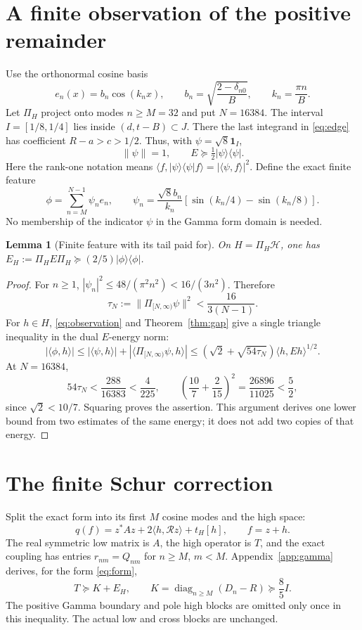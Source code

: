 \documentclass[11pt]{article}
\newtheorem{lemma}{Lemma}
\newcommand{\norm}[1]{\lVert#1\rVert}
\newcommand{\ip}[2]{\langle#1,#2\rangle}
\newcommand{\ind}{\mathbf1}
\newcommand{\HH}{\mathcal H}
\newcommand{\RR}{\mathcal R}
\begin{document}
\section{A finite observation of the positive remainder}
Use the orthonormal cosine basis
\[
 e_n(x)=b_n\cos(k_nx),\qquad b_n=\sqrt{\frac{2-\delta_{n0}}B},
 \qquad k_n=\frac{\pi n}{B}.
\]
Let $\Pi_H$ project onto modes $n\ge M=32$ and put $N=16384$. The interval $I=[1/8,1/4]$ lies inside $(d,t-B)\subset J$. There the last integrand in \eqref{eq:edge} has coefficient $R-a>c>1/2$. Thus, with $\psi=\sqrt8\ind_I$,
\begin{equation}
 \norm\psi=1,\qquad E\succeq\tfrac12|\psi\rangle\langle\psi|.
 \label{eq:observation}
\end{equation}
Here the rank-one notation means $\ip f{|\psi\rangle\langle\psi|f}=|\ip\psi f|^2$.
Define the exact finite feature
\begin{equation}
 \phi=\sum_{n=M}^{N-1}\psi_ne_n,\qquad
 \psi_n=\frac{\sqrt8 b_n}{k_n}\left[\sin(k_n/4)-\sin(k_n/8)\right].
 \label{eq:feature}
\end{equation}
No membership of the indicator $\psi$ in the Gamma form domain is needed.

\begin{lemma}[Finite feature with its tail paid for]\label{lem:feature}
On $H=\Pi_H\HH$, one has $E_H:=\Pi_HE\Pi_H\succeq(2/5)|\phi\rangle\langle\phi|$.
\end{lemma}
\begin{proof}
For $n\ge1$, $|\psi_n|^2\le48/(\pi^2n^2)<16/(3n^2)$. Therefore
\[
 \tau_N:=\norm{\Pi_{[N,\infty)}\psi}^2<\frac{16}{3(N-1)}.
\]
For $h\in H$, \eqref{eq:observation} and Theorem~\ref{thm:gap} give a single triangle inequality in the dual $E$-energy norm:
\[
 |\ip\phi h|\le |\ip\psi h|+|\ip{\Pi_{[N,\infty)}\psi}h|
 \le\left(\sqrt2+\sqrt{54\tau_N}\right)\ip h{Eh}^{1/2}.
\]
At $N=16384$,
\[
 54\tau_N<\frac{288}{16383}<\frac4{225},\qquad
 \left(\frac{10}{7}+\frac2{15}\right)^2
 =\frac{26896}{11025}<\frac52,
\]
since $\sqrt2<10/7$. Squaring proves the assertion. This argument derives one lower bound from two estimates of the same energy; it does not add two copies of that energy.
\end{proof}

\section{The finite Schur correction}
Split the exact form into its first $M$ cosine modes and the high space:
\begin{equation}
 q(f)=z^*Az+2\ip h{\RR z}+t_H[h],\qquad f=z+h.\label{eq:blocks}
\end{equation}
The real symmetric low matrix is $A$, the high operator is $T$, and the exact coupling has entries $r_{nm}=Q_{nm}$ for $n\ge M$, $m<M$. Appendix~\ref{app:gamma} derives, for the form \eqref{eq:form},
\begin{equation}
 T\succeq K+E_H,\qquad
 K=\operatorname{diag}_{n\ge M}(D_n-R)\succeq\frac85I.\label{eq:high}
\end{equation}
The positive Gamma boundary and pole high blocks are omitted only once in this inequality. The actual low and cross blocks are unchanged.
\end{document}
